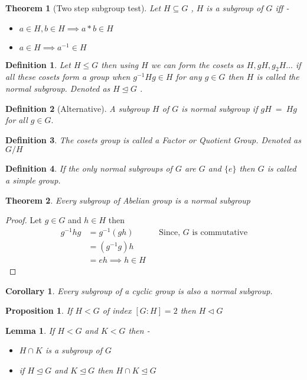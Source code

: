 \documentclass[12pt,a4paper]{article}
\newtheorem{thm}{Theorem}
\newtheorem*{defn}{Definition}
\newtheorem*{lem}{Lemma}
\newtheorem*{cor}{Corollary}
\newtheorem*{prop}{Proposition}
\begin{document}
\begin{thm}[Two step subgroup test]
	Let $H \subseteq G$ , $H$ is a subgroup of $G$ iff -
	\begin{itemize}
		\item $a \in H, b\in H \implies a*b \in H$
		\item $a \in H \implies a^{-1} \in H$
	\end{itemize}
\end{thm}
\begin{defn} \normalfont
	Let $H \le G$ then using $H$ we can form the cosets as $H, gH, g_{2}H \dots$ if all these cosets form a group when $g^{-1}Hg \in H$ for any $g\in G$ then $H$ is called the normal subgroup. Denoted as $H \trianglelefteq G$ .
\end{defn}
\begin{defn}[Alternative]
	A subgroup $H$ of $G$ is normal subgroup if $gH \: = \: Hg$ for all $g\in G.$
\end{defn}
\begin{defn} \normalfont
	The cosets group is called a Factor or Quotient Group. Denoted as $G/H$
\end{defn}
\begin{defn} \normalfont
	If the only normal subgroups of $G$ are $G$ and $\{e\}$ then $G$ is called a simple group.
\end{defn}

\begin{thm}
	Every subgroup of Abelian group is a normal subgroup
\end{thm}
\begin{proof}
	Let $g\in G$ and $h \in H$ then
	\begin{align*}
		g^{-1}hg &= g^{-1}(gh)		&& \text{Since, $G$ is commutative} \\
			     &= (g^{-1}g)h \\
			     &= eh \implies h \in H
	\end{align*}
\end{proof}
\begin{cor}
\normalfont	Every subgroup of a cyclic group is also a normal subgroup.
\end{cor}
\begin{prop}\normalfont
	If $H<G$ of index $[G:H]=2$ then $H \triangleleft G$
\end{prop}
\begin{lem}\normalfont
	If $H < G$ and $K < G$ then -
	\begin{itemize}
	\item $H \cap K$ is a subgroup of $G$
	\item if $H \trianglelefteq G$ and  $K \trianglelefteq G$ then $H \cap K \trianglelefteq G$
	\end{itemize}
\end{lem}
\end{document}
